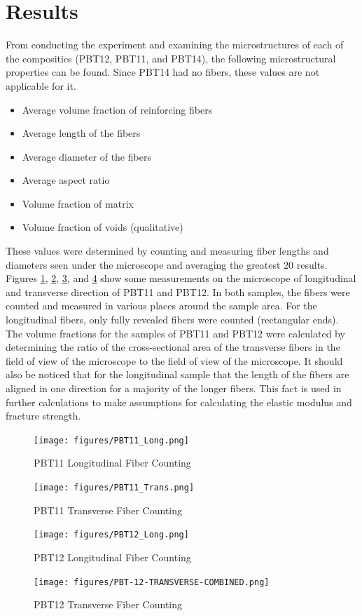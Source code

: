 \documentclass[11pt]{article}
\begin{document}
\section{Results}
From conducting the experiment and examining the microstructures of each of the composities (PBT12, PBT11, and PBT14), the following microstructural properties can be found. Since PBT14 had no fibers, these values are not applicable for it.

\begin{itemize}
\item Average volume fraction of reinforcing fibers
\item Average length of the fibers
\item Average diameter of the fibers
\item Average aspect ratio
\item Volume fraction of matrix
\item Volume fraction of voids (qualitative)
\end{itemize}

These values were determined by counting and measuring fiber lengths and diameters seen under the microscope and averaging the greatest 20 results. Figures \ref{pbt11longcount}, \ref{pbt11transcount}, \ref{pbt12longcount}, and \ref{pbt12transcount} show some measurements on the microscope of longitudinal and transverse direction of PBT11 and PBT12. In both samples, the fibers were counted and measured in various places around the sample area. For the longitudinal fibers, only fully revealed fibers were counted (rectangular ends). The volume fractions for the samples of PBT11 and PBT12 were calculated by determining the ratio of the cross-sectional area of the transverse fibers in the field of view of the microscope to the field of view of the microscope. It should also be noticed that for the longitudinal sample that the length of the fibers are aligned in one direction for a majority of the longer fibers. This fact is used in further calculations to make assumptions for calculating the elastic modulus and fracture strength.

\begin{figure}[H]
\centering
\texttt{[image: figures/PBT11\_Long.png]}
\caption{PBT11 Longitudinal Fiber Counting}
\label{pbt11longcount}
\end{figure}
\begin{figure}[H]
\centering
\texttt{[image: figures/PBT11\_Trans.png]}
\caption{PBT11 Transverse Fiber Counting}
\label{pbt11transcount}
\end{figure}
\begin{figure}[H]
\centering
\texttt{[image: figures/PBT12\_Long.png]}
\caption{PBT12 Longitudinal Fiber Counting}
\label{pbt12longcount}
\end{figure}
\begin{figure}[H]
\centering
\texttt{[image: figures/PBT-12-TRANSVERSE-COMBINED.png]}
\caption{PBT12 Transverse Fiber Counting}
\label{pbt12transcount}
\end{figure}
\end{document}
